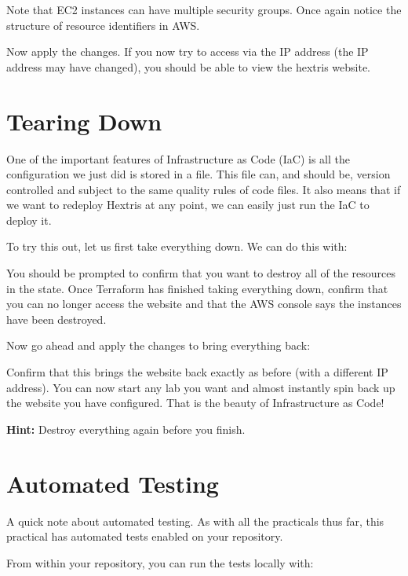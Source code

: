 \documentclass{csse4400}
\begin{document}
Note that EC2 instances can have multiple security groups.
Once again notice the structure of resource identifiers in AWS.


Now apply the changes.
If you now try to access via the IP address
(the IP address may have changed),
you should be able to view the hextris website.

\section{Tearing Down}

One of the important features of Infrastructure as Code (IaC) is all the configuration we just did is stored in a file.
This file can, and should be, version controlled and subject to the same quality rules of code files.
It also means that if we want to redeploy Hextris at any point,
we can easily just run the IaC to deploy it.

To try this out, let us first take everything down.
We can do this with:

You should be prompted to confirm that you want to destroy all of the resources in the state.
Once Terraform has finished taking everything down,
confirm that you can no longer access the website and that the AWS console says the instances have been destroyed.

Now go ahead and apply the changes to bring everything back:

Confirm that this brings the website back exactly as before (with a different IP address).
You can now start any lab you want and almost instantly spin back up the website you have configured.
That is the beauty of Infrastructure as Code!

\textbf{Hint:} Destroy everything again before you finish.

\section{Automated Testing}
A quick note about automated testing.
As with all the practicals thus far,
this practical has automated tests enabled on your repository.

From within your repository, you can run the tests locally with:
\end{document}
